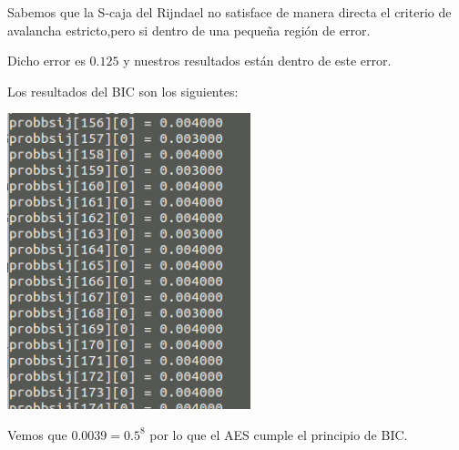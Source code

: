 \documentclass{apuntes}
\begin{document}
Sabemos que la S-caja del Rijndael  no satisface de manera directa el criterio de avalancha estricto,pero si dentro de una pequeña región de error.

Dicho error es $0.125$ y nuestros resultados están dentro de este error.

Los resultados del BIC son los siguientes:
\begin{center}
	\includegraphics[width=200pt]{BICAES.png}
\end{center}

Vemos que $0.0039 = 0.5^8$ por lo que el AES cumple el principio de BIC.
\printindex
\end{document}
